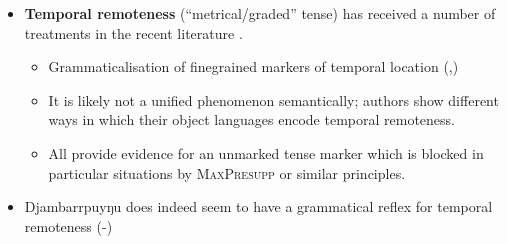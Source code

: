 \documentclass[11pt,dvipsnames]{article}
\begin{document}
\begin{minipage}{.65\textwidth}
	
	
	\begin{itemize}
		\item \textbf{Temporal remoteness} (``metrical/graded'' tense) has received a number of treatments in the recent literature \citep[e.g][]{Klecha2016,Cable2013,Bohnemeyer2018}.
		\begin{itemize}
			\item Grammaticalisation of finegrained markers of temporal location  (\citealp[84]{Comrie1983},\citealp{Dahl1983})
			\item It is likely not a unified phenomenon semantically; authors show different ways in which their object languages encode temporal remoteness.
			\item All provide evidence for an unmarked tense marker which is blocked in particular situations by \textsc{MaxPresupp} or similar principles.
		\end{itemize}
		\item Djambarrpuyŋu does indeed seem to have a grammatical reflex for temporal remoteness (-)
		
	\end{itemize}
\end{minipage}
\end{document}
